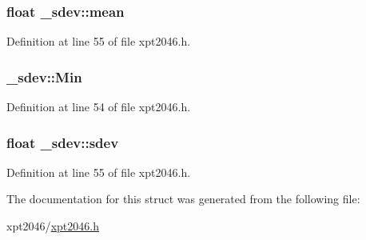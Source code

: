 \subsubsection[{\texorpdfstring{mean}{mean}}]{\setlength{\rightskip}{0pt plus 5cm}float \+\_\+sdev\+::mean}\hypertarget{struct__sdev_a2bd0cf80fd334fabaac9100a2538bcb5}{}\label{struct__sdev_a2bd0cf80fd334fabaac9100a2538bcb5}


Definition at line 55 of file xpt2046.\+h.

\subsubsection[{\texorpdfstring{Min}{Min}}]{ \+\_\+sdev\+::\+Min}\hypertarget{struct__sdev_ad496630f4d9975834148dcff8e2475c6}{}\label{struct__sdev_ad496630f4d9975834148dcff8e2475c6}


Definition at line 54 of file xpt2046.\+h.

\subsubsection[{\texorpdfstring{sdev}{sdev}}]{\setlength{\rightskip}{0pt plus 5cm}float \+\_\+sdev\+::sdev}\hypertarget{struct__sdev_a053a14f9e4bd729ce23aafdb1e69e48a}{}\label{struct__sdev_a053a14f9e4bd729ce23aafdb1e69e48a}


Definition at line 55 of file xpt2046.\+h.



The documentation for this struct was generated from the following file\+:\begin{DoxyCompactItemize}
\item 
xpt2046/\hyperlink{xpt2046_8h}{xpt2046.\+h}\end{DoxyCompactItemize}
